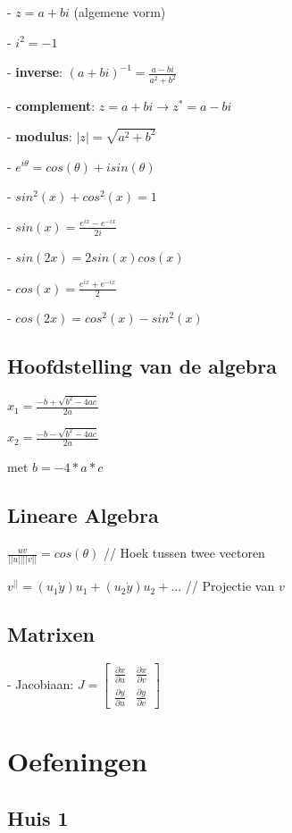 \documentclass[a4paper]{report}
\begin{document}
- $z = a + bi$ (algemene vorm)

- $i^2 = -1$

- \textbf{inverse}: $(a + bi)^{-1} = \frac{a - bi}{a^2 + b^2}$

- \textbf{complement}: $z = a + bi \rightarrow z^* = a - bi$

- \textbf{modulus}: $|z| = \sqrt{a^2 + b^2}$

- $e^{i\theta} = cos(\theta) + i sin(\theta)$

- $sin^2(x) + cos^2(x) = 1$

- $sin(x) = \frac{e^{ix} - e^{-ix}}{2i}$

- $sin(2x) = 2sin(x)cos(x)$

- $cos(x) = \frac{e^{ix} + e^{-ix}}{2}$

- $cos(2x) = cos^2(x) - sin^2(x)$

\subsection*{Hoofdstelling van de algebra}

$x_1 = \frac{-b + \sqrt{b^2 - 4ac}}{2a}$

$x_2 = \frac{-b - \sqrt{b^2 - 4ac}}{2a}$

met $b = -4*a*c$

\subsection*{Lineare Algebra}

$\frac{u\dot v}{||u|| ||v||} = cos(\theta)$ // Hoek tussen twee vectoren

$v^{||} = (u_1 \dot y) u_1 + (u_2 \dot y) u_2 + ...$ // Projectie van $v$

\subsection*{Matrixen}

- Jacobiaan: $J = \begin{bmatrix} \frac{\partial x}{\partial u} & \frac{\partial x}{\partial v} \\ \frac{\partial y}{\partial u} & \frac{\partial y}{\partial v} \end{bmatrix}$

\section*{Oefeningen}

\subsection*{Huis 1}
\end{document}
